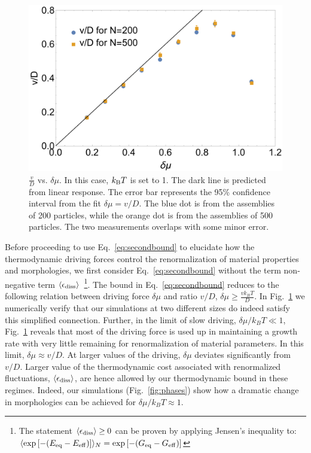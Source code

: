 \documentclass[amsmath,preprintnumbers,10pt,nofootinbib,prl,twocolumn]{revtex4-1}
\begin{document}
\begin{figure}[tbb]
\includegraphics[scale=0.3]{Fig5.pdf}
\caption{$\frac{v}{D}$ vs. $\delta\mu$. In this case, $k_{\rm B}T$ is set to 1. The dark line is predicted from linear response. The error bar represents the 95\% confidence interval from the fit $\delta\mu=v/D$. The blue dot is from the assemblies of 200 particles, while the orange dot is from the assemblies of 500 particles. The two measurements overlaps with some minor error.}
\label{fig:LinearResponse}
\end{figure}

Before proceeding to use Eq.~\ref{eq:secondbound} to elucidate how the thermodynamic driving forces control the renormalization of material properties and morphologies, we first consider Eq.~\ref{eq:secondbound} without the term non-negative term $\langle \epsilon_{\rm{diss}}\rangle$~\footnote{The statement $\langle\epsilon_{\rm diss}\rangle\geq 0$ can be proven by applying Jensen's inequality to: $\langle\exp\left[-(E_{\rm{eq}}-E_{\rm{eff}})\right]\rangle_N=\exp\left[-(G_{\rm{eq}}-G_{\rm{eff}})\right]$}. The bound in Eq.~\ref{eq:secondbound} reduces to the following relation between driving force $\delta \mu$ and ratio $v/D$, $\delta\mu\geq\frac{v k_B T}{D}$. In Fig.~\ref{fig:LinearResponse} we numerically verify that our simulations at two different sizes do indeed satisfy this simplified connection. Further, in the limit of slow driving, $\delta \mu/k_B T\ll 1$, Fig.~\ref{fig:LinearResponse} reveals that most of the driving force is used up in maintaining a growth rate with very little remaining for renormalization of material parameters. In this limit, $\delta \mu \approx v/D$. 
At larger values of the driving, $\delta \mu$ deviates significantly from $v/D$. Larger value of the thermodynamic cost associated with renormalized fluctuations, $\langle \epsilon_{\rm diss}\rangle$, are hence allowed by our thermodynamic bound in these regimes. Indeed, our simulations (Fig.~\ref{fig:phases}) show how a dramatic change in morphologies can be achieved for $\delta \mu/k_B T \approx 1$. 
\end{document}
